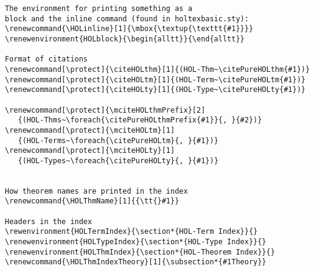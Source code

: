 \documentclass{scrartcl}
\begin{document}
\begin{verbatim}
The environment for printing something as a
block and the inline command (found in holtexbasic.sty):
\renewcommand{\HOLinline}[1]{\mbox{\textup{\texttt{#1}}}}
\renewenvironment{HOLblock}{\begin{alltt}}{\end{alltt}}

Format of citations
\renewcommand[\protect]{\citeHOLthm}[1]{(HOL-Thm~\citePureHOLthm{#1})}
\renewcommand[\protect]{\citeHOLtm}[1]{(HOL-Term~\citePureHOLtm{#1})}
\renewcommand[\protect]{\citeHOLty}[1]{(HOL-Type~\citePureHOLty{#1})}

\renewcommand[\protect]{\mciteHOLthmPrefix}[2]
   {(HOL-Thms~\foreach{\citePureHOLthmPrefix{#1}}{, }{#2})}
\renewcommand[\protect]{\mciteHOLtm}[1]
   {(HOL-Terms~\foreach{\citePureHOLtm}{, }{#1})}
\renewcommand[\protect]{\mciteHOLty}[1]
   {(HOL-Types~\foreach{\citePureHOLty}{, }{#1})}


How theorem names are printed in the index
\renewcommand{\HOLThmName}[1]{{\tt{}#1}}

Headers in the index
\rewenvironment{HOLTermIndex}{\section*{HOL-Term Index}}{}
\renewenvironment{HOLTypeIndex}{\section*{HOL-Type Index}}{}
\renewenvironment{HOLThmIndex}{\section*{HOL-Theorem Index}}{}
\renewcommand{\HOLThmIndexTheory}[1]{\subsection*{#1Theory}}
\end{verbatim}
\pagebreak
\end{document}
